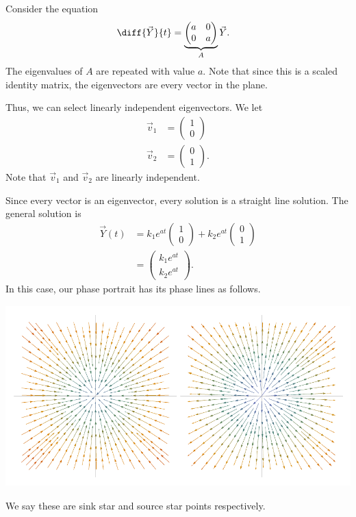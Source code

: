 \documentclass[10pt]{mypackage}
\begin{document}
\begin{example}
  Consider the equation
  \begin{align*}
    \diff{\vec{Y}}{t} &= \underbrace{\begin{pmatrix}a & 0 \\ 0 & a\end{pmatrix}}_{A} \vec{Y}.
  \end{align*}
  The eigenvalues of $A$ are repeated with value $a$. Note that since this is a scaled identity matrix, the eigenvectors are every vector in the plane.\newline

  Thus, we can select linearly independent eigenvectors. We let
  \begin{align*}
    \vec{v}_1 &= \begin{pmatrix}1\\0\end{pmatrix}\\
    \vec{v}_2 &= \begin{pmatrix}0\\1\end{pmatrix}.
  \end{align*}
  Note that $\vec{v}_1$ and $\vec{v}_2$ are linearly independent.\newline

  Since every vector is an eigenvector, every solution is a straight line solution. The general solution is
  \begin{align*}
    \vec{Y}(t) &= k_1e^{at} \begin{pmatrix}1\\0\end{pmatrix} + k_2e^{at} \begin{pmatrix}0\\1\end{pmatrix}\\
               &= \begin{pmatrix}k_1e^{at} \\ k_2e^{at}\end{pmatrix}.
  \end{align*}
  In this case, our phase portrait has its phase lines as follows. 
  \begin{center}
    \includegraphics[height=7cm]{images/source_star_sink_star.pdf}
  \end{center}
  We say these are sink star and source star points respectively.
\end{example}
\end{document}
